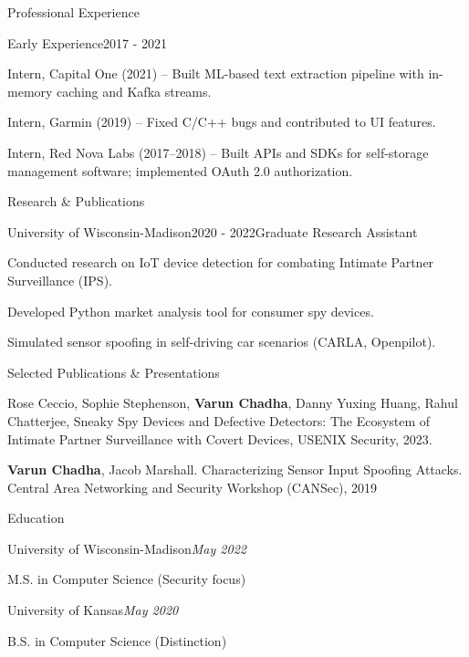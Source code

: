 \documentclass{resume}
\begin{document}
\begin{rSection}{Professional Experience}
\begin{rSubsection}{Early Experience}{2017 - 2021}{}{}
\item Intern, Capital One (2021) – Built ML-based text extraction pipeline with in-memory caching and Kafka streams.
\item Intern, Garmin (2019) – Fixed C/C++ bugs and contributed to UI features.
\item Intern, Red Nova Labs (2017–2018) – Built APIs and SDKs for self-storage management software; implemented OAuth 2.0 authorization.
\end{rSubsection}

\end{rSection}


\begin{rSection}{Research \& Publications}

\begin{rSubsection}{University of Wisconsin-Madison}{2020 - 2022}{Graduate Research Assistant}{}
\item Conducted research on IoT device detection for combating Intimate Partner Surveillance (IPS).
\item Developed Python market analysis tool for consumer spy devices.
\item Simulated sensor spoofing in self-driving car scenarios (CARLA, Openpilot).
\end{rSubsection}

\begin{rSubsection}{Selected Publications \& Presentations}{}{}{}
\item Rose Ceccio, Sophie Stephenson, {\bf Varun Chadha}, Danny Yuxing Huang, Rahul Chatterjee, Sneaky Spy Devices and Defective Detectors: The Ecosystem of Intimate Partner Surveillance with Covert Devices, USENIX Security, 2023.
\item {\bf Varun Chadha}, Jacob Marshall. Characterizing Sensor Input Spoofing Attacks. Central Area Networking and Security Workshop (CANSec), 2019
\end{rSubsection}

\end{rSection}


\begin{rSection}{Education}

\begin{rSubsection}{University of Wisconsin-Madison}{\em May 2022}{}{}
\item M.S. in Computer Science (Security focus)
\end{rSubsection}

\begin{rSubsection}{University of Kansas}{\em May 2020}{}{}
\item B.S. in Computer Science (Distinction)
\end{rSubsection}

\end{rSection}
\end{document}
